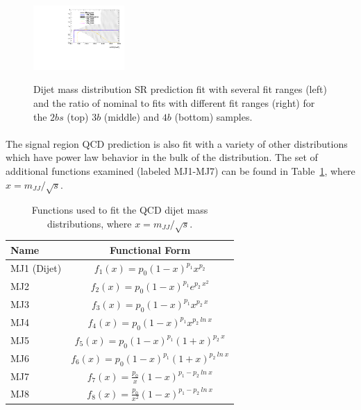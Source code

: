 \begin{figure}[htb!]
\begin{center}
\includegraphics[width=0.31\textwidth,angle=-90]{figures/boosted/Syst_Smooth/smoothFuncRangeCompare_44_comp_ratio.pdf} \\
\caption{Dijet mass distribution SR prediction fit with several fit ranges (left) and the ratio of nominal to fits with different fit ranges (right)  for the $2bs$ (top) $3b$ (middle) and $4b$ (bottom) samples. }
\label{fig:qcd_fit_range_sys_ratio-scaled}
\end{center}
\end{figure}

\paragraph{}
The signal region QCD prediction is also fit with a variety of other distributions which have power law behavior in the bulk of the distribution. 
The set of additional functions examined (labeled MJ1-MJ7) can be found in Table~\ref{tab:fit_funcs}, where $x = m_{JJ} / \sqrt{s}$.

\begin{table}[htb!]
\begin{center} 
\begin{tabular}{  l | c}
Name & Functional Form \\
\hline
MJ1 (Dijet) & $f_{1}(x) = p_0 (1-x)^{p_1} x^{p_2}$ \\
MJ2 & $f_{2}(x) = p_0 (1-x)^{p_1} e^{p_2\ x^2}$ \\
MJ3 & $f_{3}(x) = p_0 (1-x)^{p_1} x^{p_2\ x}$ \\
MJ4 & $f_{4}(x) = p_0 (1-x)^{p_1} x^{p_2\ ln\ x}$ \\
MJ5 & $f_{5}(x) = p_0 (1-x)^{p_1} (1+x)^{p_2\ x}$ \\
MJ6 & $f_{6}(x) = p_0 (1-x)^{p_1} (1+x)^{p_2\ ln\ x}$ \\
MJ7 & $f_{7}(x) = \frac{p_0}{x} (1-x)^{p_1 - p_2\ ln\ x}$ \\
MJ8 & $f_{8}(x) = \frac{p_0}{x^2} (1-x)^{p_1 - p_2\ ln\ x}$ \\
\hline
\end{tabular}
\caption{Functions used to fit the QCD dijet mass distributions, where $x = m_{JJ} / \sqrt{s}$.}
\label{tab:fit_funcs}
\end{center}
\end{table}

